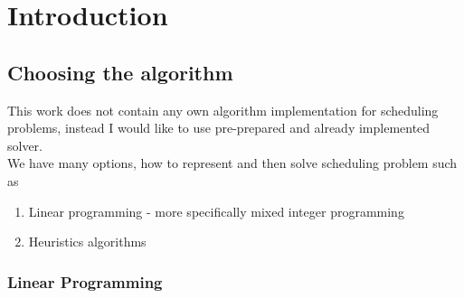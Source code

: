 
\chapter{Introduction}\label{ch:introduction}
\section{Choosing the algorithm}\label{sec:choosing-the-algorithm}

This work does not contain any own algorithm implementation for scheduling problems,
instead I would like to use pre-prepared and already implemented solver. \\
We have many options, how to represent and then solve scheduling problem such as
\begin{enumerate}
    \item Linear programming - more specifically mixed integer programming
    \item Heuristics algorithms
\end{enumerate}

\subsection{Linear Programming}\label{subsec:linear-programming}

